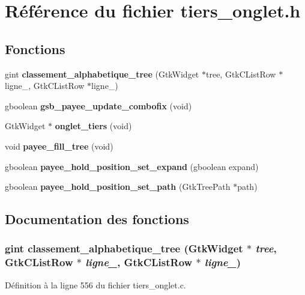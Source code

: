 \section{Référence du fichier tiers\_\-onglet.h}
\label{tiers__onglet_8h}
\subsection*{Fonctions}
\begin{DoxyCompactItemize}
\item 
gint {\bf classement\_\-alphabetique\_\-tree} (GtkWidget $\ast$tree, GtkCListRow $\ast$ligne\_, GtkCListRow $\ast$ligne\_)
\item 
gboolean {\bf gsb\_\-payee\_\-update\_\-combofix} (void)
\item 
GtkWidget $\ast$ {\bf onglet\_\-tiers} (void)
\item 
void {\bf payee\_\-fill\_\-tree} (void)
\item 
gboolean {\bf payee\_\-hold\_\-position\_\-set\_\-expand} (gboolean expand)
\item 
gboolean {\bf payee\_\-hold\_\-position\_\-set\_\-path} (GtkTreePath $\ast$path)
\end{DoxyCompactItemize}


\subsection{Documentation des fonctions}
\subsubsection[{classement\_\-alphabetique\_\-tree}]{\setlength{\rightskip}{0pt plus 5cm}gint classement\_\-alphabetique\_\-tree (GtkWidget $\ast$ {\em tree}, \/  GtkCListRow $\ast$ {\em ligne\_}, \/  GtkCListRow $\ast$ {\em ligne\_})}\label{tiers__onglet_8h_a220dbddbe43e20dae2754060704816fe}


Définition à la ligne 556 du fichier tiers\_\-onglet.c.

